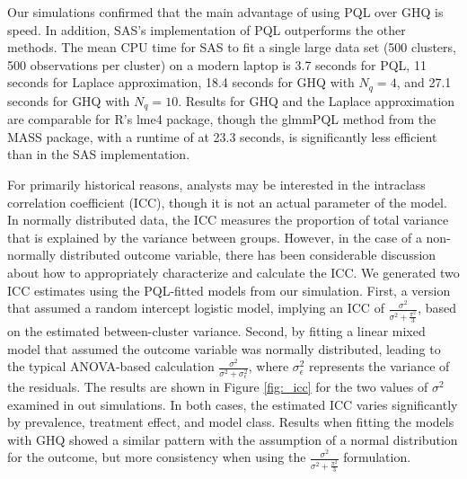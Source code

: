 \documentclass[Afour,times,sagev,doublespace]{sagej}
\begin{document}
Our simulations confirmed that the main advantage of using PQL over GHQ is speed.  In addition, SAS's implementation of PQL outperforms the other methods. The mean CPU time for SAS to fit a single large data set (500 clusters, 500 observations per cluster) on a modern laptop is 3.7 seconds for PQL, 11 seconds for Laplace approximation, 18.4 seconds for GHQ with $N_q=4$, and 27.1 seconds for GHQ with $N_q=10$. Results for GHQ and the Laplace approximation are comparable for R's lme4 package, though the glmmPQL method from the MASS package, with a runtime of at 23.3 seconds, is significantly less efficient than in the SAS implementation.


For primarily historical reasons, analysts may be interested in the intraclass correlation coefficient (ICC), though it is not an actual parameter of the model. In normally distributed data, the ICC measures the proportion of total variance that is explained by the variance between groups. However, in the case of a non-normally distributed outcome variable, there has been considerable discussion about how to appropriately characterize and calculate the ICC\cite{wu_comparison_2012}\cite{nakagawa_shinichi_coefficient_2017}. We generated two ICC estimates using the PQL-fitted models from our simulation.  First, a version that assumed a random intercept logistic model, implying an ICC of $\frac{\sigma^2}{\sigma^2+\frac{\pi^2}{3}}$, based on the estimated between-cluster variance. Second, by fitting a linear mixed model that assumed the outcome variable was normally distributed, leading to the typical ANOVA-based calculation $\frac{\sigma^2}{\sigma^2+\sigma^2_{\epsilon}}$, where $\sigma^2_{\epsilon}$ represents the variance of the residuals. The results are shown in Figure \ref{fig:_icc} for the two values of $\sigma^2$ examined in out simulations. In both cases, the estimated ICC varies significantly by prevalence, treatment effect, and model class. Results when fitting the models with GHQ showed a similar pattern with the assumption of a normal distribution for the outcome, but more consistency when using the $\frac{\sigma^2}{\sigma^2+\frac{\pi^2}{3}}$ formulation. 
\end{document}
